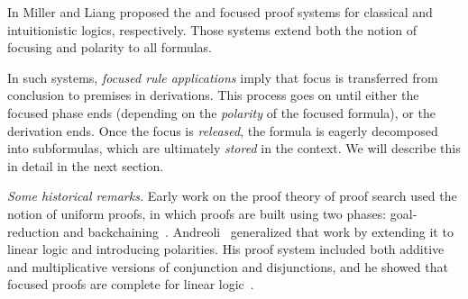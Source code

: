 In \cite{liang07csl,LiaMil09} Miller and Liang proposed the  \LKF and \LJF focused proof
systems for classical and intuitionistic logics, respectively.
%
Those systems 
extend both the notion of focusing and polarity to
all formulas. 

In such systems, {\em focused rule applications} imply that focus is transferred from conclusion to premises in derivations. This process goes on until either the focused phase ends (depending on the {\em polarity} of the focused formula), or the derivation ends.
Once the focus is \emph{released}, the formula is eagerly decomposed into subformulas, which are ultimately {\em stored} in the context. 
%
We will describe this in detail in the next section.

{\em Some historical remarks.} Early work on the proof theory of proof search used the notion of uniform proofs, in which proofs are built using two phases: goal-reduction and backchaining~\cite{miller91apal}. Andreoli~\cite{andreoli92jlc} generalized that work by extending it to linear logic and introducing polarities. His proof system included both additive and multiplicative versions of conjunction and disjunctions, and he showed that focused proofs are complete for linear logic~\cite{DBLP:journals/tcs/Girard87}.

